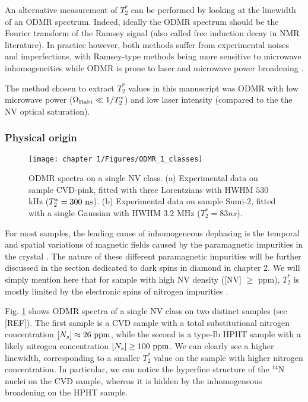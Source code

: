\documentclass[a4paper, 11pt]{book}
\begin{document}
An alternative measurement of $T_2^*$ can be performed by looking at the linewidth of an ODMR spectrum. Indeed, ideally the ODMR spectrum should be the Fourier transform of the Ramsey signal (also called free induction decay in NMR literature). In practice however, both methods suffer from experimental noises and imperfections, with Ramsey-type methods being more sensitive to microwave inhomogeneities \citep{barry2020sensitivity} while ODMR is prone to laser and microwave power broadening \citep{dreau2011avoiding}. 

The method chosen to extract $T_2^*$ values in this manuscript was ODMR with low microwave power ($\Omega_{\rm Rabi} \ll 1/T_2^*$) and low laser intensity (compared to the the NV optical saturation).

\subsubsection{Physical origin}

\begin{figure}[h!]
\centering
\texttt{[image: chapter 1/Figures/ODMR\_1\_classes]}
\caption{ODMR spectra on a single NV class. (a) Experimental data on sample CVD-pink, fitted with three Lorentzians with HWHM $530$ kHz ($T_2^*=300\ \rm ns$). (b) Experimental data on sample Sumi-2, fitted with a single Gaussian with HWHM $3.2$ MHz ($T_2^*=83 ns$).}
\label{ODMR 1 classe}
\end{figure}

For most samples, the leading cause of inhomogeneous dephasing is the temporal and spatial variations of magnetic fields caused by the paramagnetic impurities in the crystal \citep{barry2020sensitivity}. The nature of these different paramagnetic impurities will be further discussed in the section dedicated to dark spins in diamond in chapter 2. We will simply mention here that for sample with high NV density ([NV] $\geq$ ppm), $T_2^*$ is mostly limited by the electronic spins of nitrogen impurities \citep{bauch2018ultralong}.

Fig. \ref{ODMR 1 classe} shows ODMR spectra of a single NV class on two distinct samples (see [REF]). The first sample is a CVD sample with a total substitutional nitrogen  concentration $[N_s] \approx 26\ \rm ppm$, while the second is a type-Ib HPHT sample with a likely nitrogen concentration $[N_s] \geq 100\ \rm ppm$. We can clearly see a higher linewidth, corresponding to a smaller $T_2^*$ value on the sample with higher nitrogen concentration. In particular, we can notice the hyperfine structure of the $^{14}$N nuclei on the CVD sample, whereas it is hidden by the inhomogeneous broadening on the HPHT sample.
\end{document}
